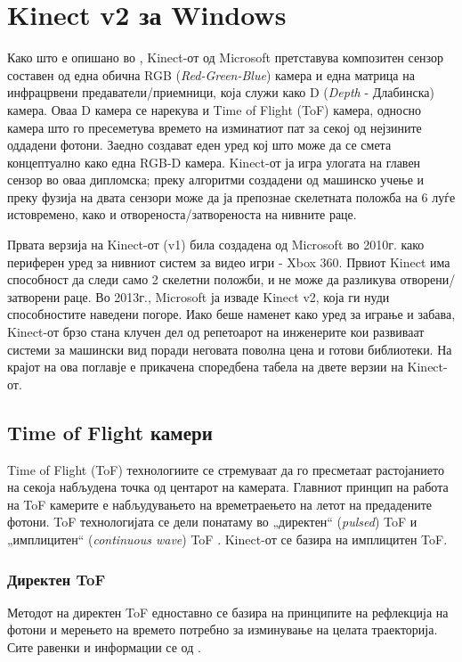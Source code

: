 \documentclass[11pt]{article}
\begin{document}
\newpage

\section{Kinect v2 за Windows}
	Како што е опишано во \cite{wassenmuller}, Kinect-от од Microsoft претставува композитен сензор составен од една обична RGB (\textit{Red-Green-Blue}) камера и една матрица на инфрацрвени предаватели/приемници, која служи како D (\textit{Depth} - Длабинска) камера. Оваа D камера се нарекува и Time of Flight (ToF) камера, односно камера што го пресеметува времето на изминатиот пат за секој од нејзините оддадени фотони. Заедно создават еден уред кој што може да се смета концептуално како една RGB-D камера. Kinect-от ја игра улогата на главен сензор во оваа дипломска; преку алгоритми создадени од машинско учење и преку фузија на двата сензори може да ја препознае скелетната положба на 6 луѓе истовремено, како и отвореноста/затвореноста на нивните раце.

	Првата верзија на Kinect-от (v1) била создадена од Microsoft во 2010г. како периферен уред за нивниот систем за видео игри - Xbox 360. Првиот Kinect има способност да следи само 2 скелетни положби, и не може да разликува отворени/затворени раце. Во 2013г., Microsoft ја изваде Kinect v2, која ги нуди способностите наведени погоре. Иако беше наменет како уред за играње и забава, Kinect-от брзо стана клучен дел од репетоарот на инженерите кои развиваат системи за машински вид поради неговата поволна цена и готови библиотеки. На крајот на ова поглавје е прикачена споредбена табела на двете верзии на Kinect-от.
  \subsection{Time of Flight камери}
  	Time of Flight (ToF) технологиите се стремуваат да го пресметаат растојанието на секоја набљудена точка од центарот на камерата. Главниот принцип на работа на ToF камерите е набљудувањето на времетраењето на летот на предадените фотони. ToF технологијата се дели понатаму во „директен“ (\textit{pulsed}) ToF и „имплицитен“ (\textit{continuous wave}) ToF \cite{tofwhitepaper}. Kinect-от се базира на имплицитен ToF.

	  \subsubsection{Директен ToF}
		  Методот на директен ToF едноставно се базира на принципите на рефлекција на фотони и мерењето на времето потребно за изминување на целата траекторија. Сите равенки и информации се од \cite{tofwhitepaper}.
\end{document}
